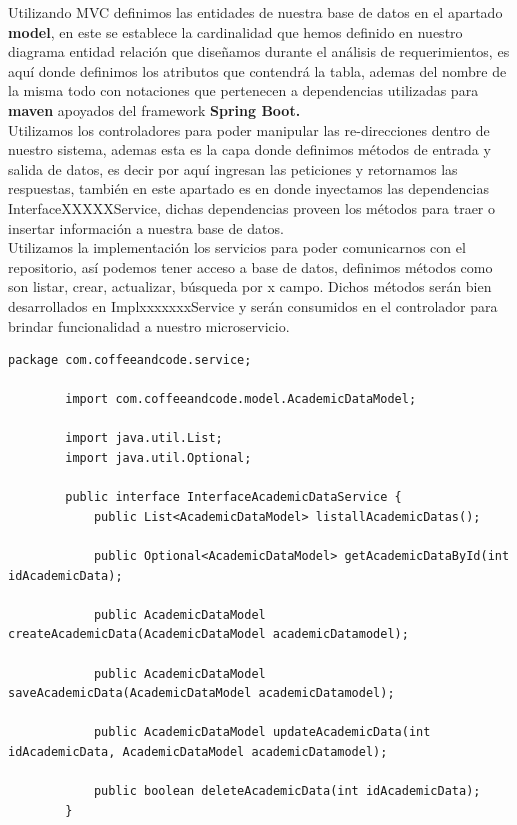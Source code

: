 	Utilizando MVC definimos las entidades de nuestra base de datos en el apartado \textbf{model}, en este se establece la cardinalidad que hemos definido en nuestro diagrama entidad relación que diseñamos durante el análisis de requerimientos, es aquí donde definimos los atributos que contendrá la tabla, ademas del nombre de la misma todo con notaciones que pertenecen a dependencias utilizadas para \textbf{maven} apoyados del framework \textbf{Spring Boot.}\\
	
	Utilizamos los controladores para poder manipular las re-direcciones dentro de nuestro sistema, ademas esta es la capa donde definimos métodos de entrada y salida de datos, es decir por aquí ingresan las peticiones y retornamos las respuestas, también en este apartado es en donde inyectamos las dependencias InterfaceXXXXXService, dichas dependencias proveen los métodos para traer o insertar información a nuestra base de datos.\\
	
	Utilizamos la implementación los servicios para poder comunicarnos con el repositorio, así podemos tener acceso a base de datos, definimos métodos como son listar, crear, actualizar, búsqueda por x campo.
	Dichos métodos serán bien desarrollados en ImplxxxxxxxService y serán consumidos en el controlador para brindar funcionalidad a nuestro microservicio.
	\begin{lstlisting}[style=JavaStyle, caption=Ejemplo de definición de interfacexxxxxxService, label=lst:java]
		package com.coffeeandcode.service;
		
		import com.coffeeandcode.model.AcademicDataModel;
		
		import java.util.List;
		import java.util.Optional;
		
		public interface InterfaceAcademicDataService {
			public List<AcademicDataModel> listallAcademicDatas();
			
			public Optional<AcademicDataModel> getAcademicDataById(int idAcademicData);
			
			public AcademicDataModel createAcademicData(AcademicDataModel academicDatamodel);
			
			public AcademicDataModel saveAcademicData(AcademicDataModel academicDatamodel);
			
			public AcademicDataModel updateAcademicData(int idAcademicData, AcademicDataModel academicDatamodel);
			
			public boolean deleteAcademicData(int idAcademicData);
		}
	\end{lstlisting}
	
